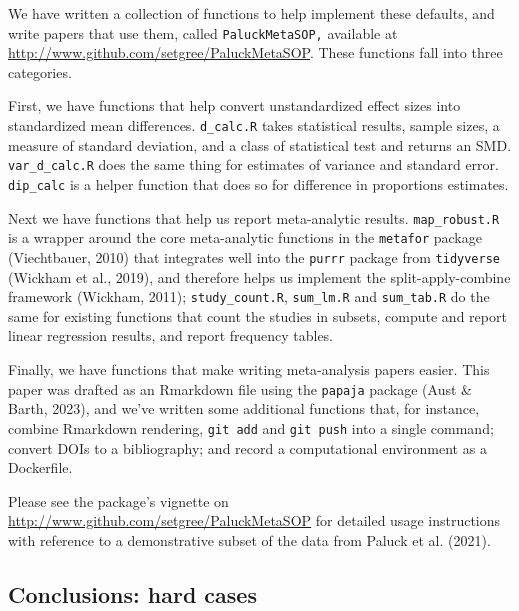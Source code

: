 \documentclass[
  man]{apa6}
\begin{document}
We have written a collection of functions to help implement these defaults, and write papers that use them, called \texttt{PaluckMetaSOP,} available at \url{http://www.github.com/setgree/PaluckMetaSOP}. These functions fall into three categories.

First, we have functions that help convert unstandardized effect sizes into standardized mean differences. \texttt{d\_calc.R} takes statistical results, sample sizes, a measure of standard deviation, and a class of statistical test and returns an SMD. \texttt{var\_d\_calc.R} does the same thing for estimates of variance and standard error. \texttt{dip\_calc} is a helper function that does so for difference in proportions estimates.

Next we have functions that help us report meta-analytic results. \texttt{map\_robust.R} is a wrapper around the core meta-analytic functions in the \texttt{metafor} package (Viechtbauer, 2010) that integrates well into the \texttt{purrr} package from \texttt{tidyverse} (Wickham et al., 2019), and therefore helps us implement the split-apply-combine framework (Wickham, 2011); \texttt{study\_count.R}, \texttt{sum\_lm.R} and \texttt{sum\_tab.R} do the same for existing functions that count the studies in subsets, compute and report linear regression results, and report frequency tables.

Finally, we have functions that make writing meta-analysis papers easier. This paper was drafted as an Rmarkdown file using the \texttt{papaja} package (Aust \& Barth, 2023), and we've written some additional functions that, for instance, combine Rmarkdown rendering, \texttt{git\ add} and \texttt{git\ push} into a single command; convert DOIs to a bibliography; and record a computational environment as a Dockerfile.

Please see the package's vignette on \url{http://www.github.com/setgree/PaluckMetaSOP} for detailed usage instructions with reference to a demonstrative subset of the data from Paluck et al. (2021).

\subsection{Conclusions: hard cases}\label{conclusions-hard-cases}
\end{document}
